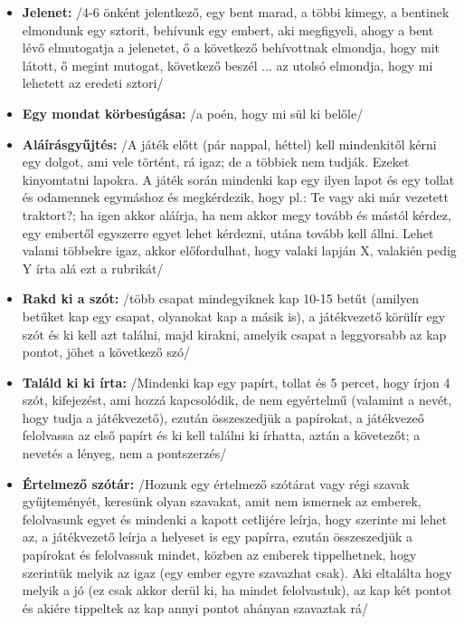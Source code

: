 \documentclass[a4paper, 12pt, twoside, openright]{article}
\begin{document}
\begin{itemize}
\item \textbf{Jelenet:} /4-6 önként jelentkező, egy bent marad, a többi kimegy, a bentinek elmondunk egy sztorit, behívunk egy embert, aki megfigyeli, ahogy a bent lévő elmutogatja a jelenetet, ő a következő behívottnak elmondja, hogy mit látott, ő megint mutogat, következő beszél ... az utolsó elmondja, hogy mi lehetett az eredeti sztori/

\item \textbf{Egy mondat körbesúgása:} /a poén, hogy mi sül ki belőle/

\item \textbf{Aláírásgyűjtés:} /A játék előtt (pár nappal, héttel) kell mindenkitől kérni egy dolgot, ami vele történt, rá igaz; de a többiek nem tudják. Ezeket kinyomtatni lapokra. A játék során mindenki kap egy ilyen lapot és egy tollat és odamennek egymáshoz és megkérdezik, hogy pl.: Te vagy aki már vezetett traktort?; ha igen akkor aláírja, ha nem akkor megy tovább és mástól kérdez, egy embertől egyszerre egyet lehet kérdezni, utána tovább kell állni. Lehet valami többekre igaz, akkor előfordulhat, hogy valaki lapján X, valakién pedig Y írta alá ezt a rubrikát/

\item \textbf{Rakd ki a szót:} /több csapat mindegyiknek kap 10-15 betűt (amilyen betűket kap egy csapat, olyanokat kap a másik is), a játékvezető körülír egy szót és ki kell azt találni, majd kirakni, amelyik csapat a leggyorsabb az kap pontot, jöhet a következő szó/

\item \textbf{Találd ki ki írta:} /Mindenki kap egy papírt, tollat és 5 percet, hogy írjon 4 szót, kifejezést, ami hozzá kapcsolódik, de nem egyértelmű (valamint a nevét, hogy tudja a játékvezető), ezután összeszedjük a papírokat, a játékvezeő felolvassa az első papírt és ki kell találni ki írhatta, aztán a követezőt; a nevetés a lényeg, nem a pontszerzés/

\item \textbf{Értelmező szótár:} /Hozunk egy értelmező szótárat vagy régi szavak gyűjteményét, keresünk olyan szavakat, amit nem ismernek az emberek, felolvasunk egyet és mindenki a kapott cetlijére leírja, hogy szerinte mi lehet az, a játékvezető leírja a helyeset is egy papírra, ezután összeszedjük a papírokat és felolvassuk mindet, közben az emberek tippelhetnek, hogy szerintük melyik az igaz (egy ember egyre szavazhat csak). Aki eltalálta hogy melyik a jó (ez csak akkor derül ki, ha mindet felolvastuk), az kap két pontot és akiére tippeltek az kap annyi pontot ahányan szavaztak rá/


\end{itemize}
\end{document}

